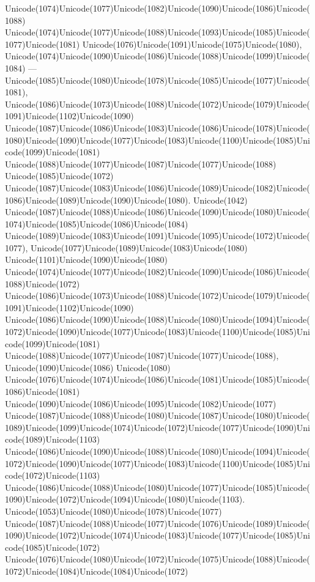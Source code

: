 \documentclass[a4paper,11pt]{report}
\begin{document}
{{Unicode(1074)Unicode(1077)Unicode(1082)Unicode(1090)Unicode(1086)Unicode(1088)
Unicode(1074)Unicode(1077)Unicode(1088)Unicode(1093)Unicode(1085)Unicode(1077)Unicode(1081)
Unicode(1076)Unicode(1091)Unicode(1075)Unicode(1080),
Unicode(1074)Unicode(1090)Unicode(1086)Unicode(1088)Unicode(1099)Unicode(1084)
---
Unicode(1085)Unicode(1080)Unicode(1078)Unicode(1085)Unicode(1077)Unicode(1081),
Unicode(1086)Unicode(1073)Unicode(1088)Unicode(1072)Unicode(1079)Unicode(1091)Unicode(1102)Unicode(1090)
Unicode(1087)Unicode(1086)Unicode(1083)Unicode(1086)Unicode(1078)Unicode(1080)Unicode(1090)Unicode(1077)Unicode(1083)Unicode(1100)Unicode(1085)Unicode(1099)Unicode(1081)
Unicode(1088)Unicode(1077)Unicode(1087)Unicode(1077)Unicode(1088)
Unicode(1085)Unicode(1072)
Unicode(1087)Unicode(1083)Unicode(1086)Unicode(1089)Unicode(1082)Unicode(1086)Unicode(1089)Unicode(1090)Unicode(1080).
Unicode(1042)
Unicode(1087)Unicode(1088)Unicode(1086)Unicode(1090)Unicode(1080)Unicode(1074)Unicode(1085)Unicode(1086)Unicode(1084)
Unicode(1089)Unicode(1083)Unicode(1091)Unicode(1095)Unicode(1072)Unicode(1077),
Unicode(1077)Unicode(1089)Unicode(1083)Unicode(1080)
Unicode(1101)Unicode(1090)Unicode(1080)
Unicode(1074)Unicode(1077)Unicode(1082)Unicode(1090)Unicode(1086)Unicode(1088)Unicode(1072)
Unicode(1086)Unicode(1073)Unicode(1088)Unicode(1072)Unicode(1079)Unicode(1091)Unicode(1102)Unicode(1090)
Unicode(1086)Unicode(1090)Unicode(1088)Unicode(1080)Unicode(1094)Unicode(1072)Unicode(1090)Unicode(1077)Unicode(1083)Unicode(1100)Unicode(1085)Unicode(1099)Unicode(1081)
Unicode(1088)Unicode(1077)Unicode(1087)Unicode(1077)Unicode(1088),
Unicode(1090)Unicode(1086) Unicode(1080)
Unicode(1076)Unicode(1074)Unicode(1086)Unicode(1081)Unicode(1085)Unicode(1086)Unicode(1081)
Unicode(1090)Unicode(1086)Unicode(1095)Unicode(1082)Unicode(1077)
Unicode(1087)Unicode(1088)Unicode(1080)Unicode(1087)Unicode(1080)Unicode(1089)Unicode(1099)Unicode(1074)Unicode(1072)Unicode(1077)Unicode(1090)Unicode(1089)Unicode(1103)
Unicode(1086)Unicode(1090)Unicode(1088)Unicode(1080)Unicode(1094)Unicode(1072)Unicode(1090)Unicode(1077)Unicode(1083)Unicode(1100)Unicode(1085)Unicode(1072)Unicode(1103)
Unicode(1086)Unicode(1088)Unicode(1080)Unicode(1077)Unicode(1085)Unicode(1090)Unicode(1072)Unicode(1094)Unicode(1080)Unicode(1103).  Unicode(1053)Unicode(1080)Unicode(1078)Unicode(1077)
Unicode(1087)Unicode(1088)Unicode(1077)Unicode(1076)Unicode(1089)Unicode(1090)Unicode(1072)Unicode(1074)Unicode(1083)Unicode(1077)Unicode(1085)Unicode(1085)Unicode(1072)
Unicode(1076)Unicode(1080)Unicode(1072)Unicode(1075)Unicode(1088)Unicode(1072)Unicode(1084)Unicode(1084)Unicode(1072)
}}
\end{document}
